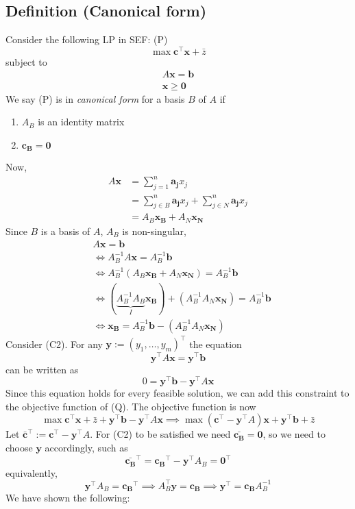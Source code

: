 \subsection{Definition (Canonical form)}
Consider the following LP in SEF: (P)
\[\max \mathbf{c}^\top  \mathbf{x}+\bar{z}\]
subject to
\begin{align*}
    A\mathbf{x}=\mathbf{b}\\
    \mathbf{x}\ge \mathbf{0}
\end{align*}
We say (P) is in \emph{canonical form} for a basis $B$ of $A$ if
\begin{enumerate}[(C1)]
    \item $A_B$ is an identity matrix
    \item $\mathbf{c_B}=\mathbf{0}$
\end{enumerate}
Now,
\begin{align*}
    A\mathbf{x}
    &=\sum_{j = 1}^{n}\mathbf{a_j}x_j\\
    &=\sum_{j\in B}^{n}\mathbf{a_j}x_j+\sum_{j\in N}^{n}\mathbf{a_j}x_j\\
    &=A_B \mathbf{x_B}+A_N \mathbf{x_N}
\end{align*}
Since $B$ is a basis of $A$, $A_B$ is non-singular,
\begin{align*}
    &A\mathbf{x}=\mathbf{b}\\
    &\iff
    A_B^{-1}A\mathbf{x}=A_B^{-1}\mathbf{b}\\
    &\iff
    A_B^{-1}(A_B\mathbf{x_B}+A_N\mathbf{x_N})=A_B^{-1}\mathbf{b}\\
    &\iff
    (\underbrace{A_B^{-1} A_B}_{I}\mathbf{x_B})+
    (A_B^{-1} A_N\mathbf{x_N})=A_B^{-1}\mathbf{b}\\
    &\iff
    \mathbf{x_B}=A_B^{-1}\mathbf{b}-(A_B^{-1} A_N\mathbf{x_N})
\end{align*}
Consider (C2). For any $\mathbf{y}:=(y_1,\dots, y_m)^\top$
the equation
\[\mathbf{y}^\top A\mathbf{x}=\mathbf{y}^\top \mathbf{b}\]
can be written as
\[0=\mathbf{y}^\top \mathbf{b}-\mathbf{y}^\top A\mathbf{x}\]
Since  this  equation  holds  for  every  feasible  solution,  we  can  add  this 
constraint to the objective function of (Q). The objective function is now
\[\max \mathbf{c}^\top  \mathbf{x}+\bar{z}+\mathbf{y}^\top \mathbf{b}-\mathbf{y}^\top A\mathbf{x}
\implies
\max (\mathbf{c}^\top -\mathbf{y}^\top A)\mathbf{x}+\mathbf{y}^\top \mathbf{b}+\bar{z}\]
Let $\mathbf{\bar{c}}^\top :=\mathbf{c}^\top -\mathbf{y}^\top A$. For (C2) to be satisfied we need
$\mathbf{\bar{c_B}}=\mathbf{0}$, so we need to choose $\mathbf{y}$ accordingly, such as
\[\mathbf{\bar{c_B}}^\top =\mathbf{c_B}^\top -\mathbf{y}^\top A_B=\mathbf{0}^\top \]
equivalently,
\[\mathbf{y}^\top A_B=\mathbf{c_B}^\top 
\implies
A_B^\top \mathbf{y}=\mathbf{c_B}
\implies
\mathbf{y}^\top =\mathbf{c_B}A_B^{-1}\]
We have shown the following:

